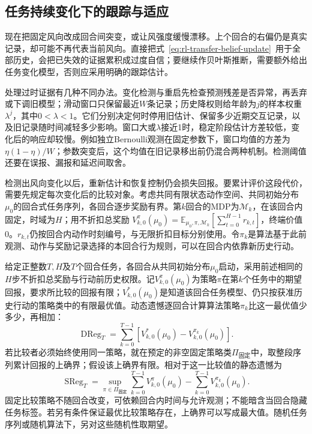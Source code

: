 \subsection{任务持续变化下的跟踪与适应}
\label{sec:rl-transfer-tracking}

现在把固定风向改成回合间突变，或让风强度缓慢漂移。上个回合的右偏仍是真实记录，却可能不再代表当前风向。直接把式~\eqref{eq:rl-transfer-belief-update}~用于全部历史，会把已失效的证据累积成过度自信；要继续作贝叶斯推断，需要额外给出任务变化模型，否则应采用明确的跟踪估计。

处理过时证据有几种不同办法。变化检测与重启先检查预测残差是否异常，再丢弃或下调旧模型；滑动窗口只保留最近$W$条记录；历史降权则给年龄为$j$的样本权重$\lambda^j$，其中$0<\lambda<1$。它们分别决定何时停用旧估计、保留多少近期交互记录，以及旧记录随时间减轻多少影响。窗口大或$\lambda$接近1时，稳定阶段估计方差较低，变化后的响应却较慢。例如独立Bernoulli观测在固定参数下，窗口均值的方差为$\eta(1-\eta)/W$；参数突变后，这个均值在旧记录移出前仍混合两种机制。检测阈值还要在误报、漏报和延迟间取舍。

检测出风向变化以后，重新估计和恢复控制仍会损失回报。要累计评价这段代价，需要先规定每次变化后的比较对象。考虑共同有限状态动作空间、共同初始分布$\mu_0$的回合式任务序列，各回合逐步奖励有界。第$k$回合的MDP为$\mathcal M_k$，在该回合内固定，时域为$H$；用不折扣总奖励
$V_{k,0}^{\pi}(\mu_0)=\mathbb E_{\mu_0,\pi,\mathcal M_k}
[\sum_{t=0}^{H-1}r_{k,t}]$，终端价值0。$r_{k,t}$仍按回合内动作时刻编号，与无限折扣目标分别使用。令$\pi_k$是算法基于此前观测、动作与奖励记录选择的本回合行为规则，可以在回合内依靠新历史行动。

\begin{definition}[动态遗憾与静态遗憾]
 \label{def:rl-transfer-regret}
 给定正整数$T,H$及$T$个回合任务，各回合从共同初始分布$\mu_0$启动，采用前述相同的$H$步不折扣总奖励与行动前历史权限。记$V_{k,0}^{\pi}(\mu_0)$为策略$\pi$在第$k$个任务中的期望回报，要求所比较的回报有限；$V_{k,0}^*(\mu_0)$是知道该回合任务模型、仍只按获准历史行动的策略类中的有限最优值。动态遗憾逐回合计算算法策略$\pi_k$比这一最优值少多少，再相加：
 \begin{equation}
 \operatorname{DReg}_T
 =\sum_{k=0}^{T-1}\left[
 V_{k,0}^{*}(\mu_0)-V_{k,0}^{\pi_k}(\mu_0)\right].
 \label{eq:rl-transfer-dynamic-regret}
 \end{equation}
 若比较者必须始终使用同一策略，就在预定的非空固定策略类$\Pi_{\text{固定}}$中，取整段序列累计回报的上确界；假设该上确界有限。相对于这一比较值的静态遗憾为
 \begin{equation}
 \operatorname{SReg}_T
 =\sup_{\pi\in\Pi_{\text{固定}}}
       \sum_{k=0}^{T-1}V_{k,0}^{\pi}(\mu_0)
       -\sum_{k=0}^{T-1}V_{k,0}^{\pi_k}(\mu_0).
 \label{eq:rl-transfer-static-regret}
 \end{equation}
 固定比较策略不随回合改变，可依赖回合内时间与允许观测；不能暗含当回合隐藏任务标签。若另有条件保证最优比较策略存在，上确界可以写成最大值。随机任务序列或随机算法下，另对这些随机性取期望。
\end{definition}

